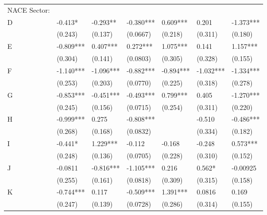 \documentclass[Review,times,sageh,11pt]{sagej}
\begin{document}
\begin{table}[thb]
{\begin{threeparttable}
\begin{tabular}{l*{6}{l}}
NACE Sector:              \\[1ex]
\quad D                   &  -0.413*   & -0.293**  & -0.380***  & 0.609***  & 0.201      & -1.373***  \\
                          &  (0.243)   & (0.137)   & (0.0667)   & (0.218)   & (0.311)    & (0.180)    \\[0.5ex]

\quad E                   &  -0.809*** & 0.407***  & 0.272***   & 1.075***  & 0.141      & 1.157***   \\
                          &  (0.304)   & (0.141)   & (0.0803)   & (0.305)   & (0.328)    & (0.155)    \\[0.5ex]

\quad F                   &  -1.140*** & -1.096*** & -0.882***  & -0.894*** & -1.032***  & -1.334***  \\
                          &  (0.253)   & (0.203)   & (0.0770)   & (0.225)   & (0.318)    & (0.278)    \\[0.5ex]

\quad G                   &  -0.853*** & -0.451*** & -0.493***  & 0.799***  & 0.405      & -1.270***  \\
                          &  (0.245)   & (0.156)   & (0.0715)   & (0.254)   & (0.311)    & (0.220)    \\[0.5ex]

\quad H                   &  -0.999*** & 0.275     & -0.808***  &           & -0.510     & -0.486***  \\
                          &  (0.268)   & (0.168)   & (0.0832)   &           & (0.334)    & (0.182)    \\[0.5ex]

\quad I                   &  -0.441*   & 1.229***  & -0.112     & -0.168    & -0.248     & 0.573***   \\
                          &  (0.248)   & (0.136)   & (0.0705)   & (0.228)   & (0.310)    & (0.152)    \\[0.5ex]

\quad J                   &  -0.0811   & -0.816*** & -1.105***  & 0.216     & 0.562*     & -0.00925   \\
                          &  (0.255)   & (0.161)   & (0.0818)   & (0.309)   & (0.315)    & (0.158)    \\[0.5ex]

\quad K                   &  -0.744*** & 0.117     & -0.509***  & 1.391***  & 0.0816     & 0.169      \\
                          &  (0.247)   & (0.139)   & (0.0728)   & (0.286)   & (0.314)    & (0.155)    \\[0.5ex]


\end{tabular}
\end{threeparttable}}
\end{table}
\end{document}
